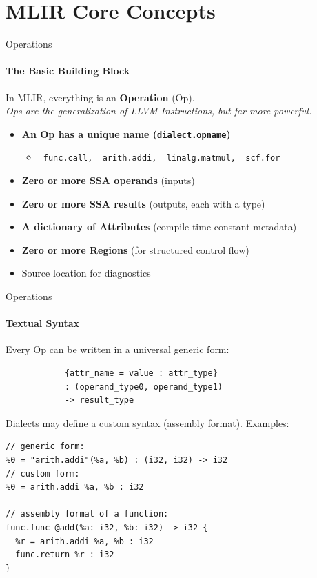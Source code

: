 \section{MLIR Core Concepts}


\begin{frame}{Operations}
  \framesubtitle{The Basic Building Block}
  In MLIR, everything is an \textbf{\textcolor{mainAccent}{Operation}} (Op).\\
  \textit{\small Ops are the generalization of LLVM Instructions, but far more powerful.}

  \bigskip
  \begin{itemize}
    \item \textbf{An Op has a unique name (\texttt{dialect.opname})}
      \begin{itemize}
        \item \texttt{\textcolor{mainAccent}{%
              func.call,\ \ arith.addi,\ \ linalg.matmul,\ \ scf.for}}
      \end{itemize}
    \item \textbf{Zero or more SSA operands} (inputs)
    \item \textbf{Zero or more SSA results} (outputs, each with a type)
    \item \textbf{A dictionary of Attributes} (compile-time constant metadata)
    \item \textbf{Zero or more Regions} (for structured control flow)
    \item Source location for diagnostics
  \end{itemize}
\end{frame}


\begin{frame}[fragile]{Operations}
  \framesubtitle{Textual Syntax}
  Every Op can be written in a universal generic form:
\begin{lstlisting}[language=none,basicstyle=\ttfamily\small]
%result = "dialect.op_name"(%arg0, %arg1)
            {attr_name = value : attr_type}
            : (operand_type0, operand_type1)
            -> result_type
\end{lstlisting}

  Dialects may define a custom syntax (assembly format). Examples:
\begin{lstlisting}[language=none,basicstyle=\ttfamily\small]
// generic form:
%0 = "arith.addi"(%a, %b) : (i32, i32) -> i32
// custom form:
%0 = arith.addi %a, %b : i32

// assembly format of a function:
func.func @add(%a: i32, %b: i32) -> i32 {
  %r = arith.addi %a, %b : i32
  func.return %r : i32
}
\end{lstlisting}
\end{frame}


